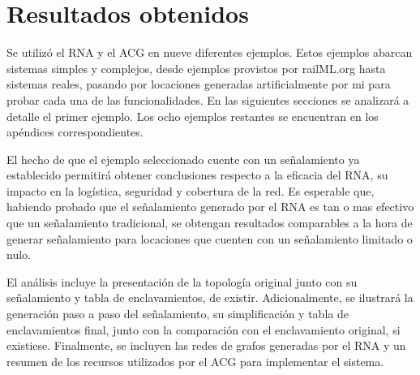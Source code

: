 \chapter{Resultados obtenidos}
	\label{sec:resultados}

	Se utilizó el RNA y el ACG en nueve diferentes ejemplos. Estos ejemplos abarcan sistemas simples y complejos, desde ejemplos provistos por railML.org hasta sistemas reales, pasando por locaciones generadas artificialmente por mi para probar cada una de las funcionalidades. En las siguientes secciones se analizará a detalle el primer ejemplo. Los ocho ejemplos restantes se encuentran en los apéndices correspondientes.
	
	El hecho de que el ejemplo seleccionado cuente con un señalamiento ya establecido permitirá obtener conclusiones respecto a la eficacia del RNA, su impacto en la logística, seguridad y cobertura de la red. Es esperable que, habiendo probado que el señalamiento generado por el RNA es tan o mas efectivo que un señalamiento tradicional, se obtengan resultados comparables a la hora de generar señalamiento para locaciones que cuenten con un señalamiento limitado o nulo.	
	
	El análisis incluye la presentación de la topología original junto con su señalamiento y tabla de enclavamientos, de existir. Adicionalmente, se ilustrará la generación paso a paso del señalamiento, su simplificación y tabla de enclavamientos final, junto con la comparación con el enclavamiento original, si existiese. Finalmente, se incluyen las redes de grafos generadas por el RNA y un resumen de los recursos utilizados por el ACG para implementar el sistema.	


%
%
%
%
%
%
%
%
